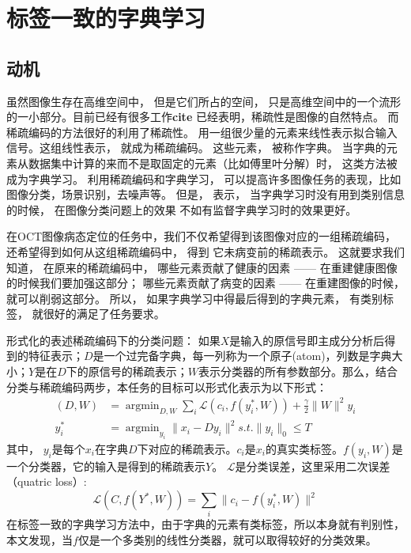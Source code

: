 \section{标签一致的字典学习}
\label{sec:lc-ksvd}
    \subsection{动机}
    虽然图像生存在高维空间中， 但是它们所占的空间， 只是高维空间中的一个流形的一小部分。目前已经有很多工作\textbf{cite} 已经表明，稀疏性是图像的自然特点。 而稀疏编码的方法很好的利用了稀疏性。 用一组很少量的元素来线性表示拟合输入信号。这组线性表示， 就成为稀疏编码。 这些元素， 被称作字典。 当字典的元素从数据集中计算的来而不是取固定的元素（比如傅里叶分解）时， 这类方法被成为字典学习。  利用稀疏编码和字典学习， 可以提高许多图像任务的表现，比如图像分类\cite{}，场景识别\cite{}，去噪声\cite{}等。  但是， \cite{}表示， 当字典学习时没有用到类别信息的时候，  在图像分类问题上的效果 不如有监督字典学习时的效果更好。 

    在OCT图像病态定位的任务中，我们不仅希望得到该图像对应的一组稀疏编码， 还希望得到如何从这组稀疏编码中， 得到 它未病变前的稀疏表示。 这就要求我们 知道， 在原来的稀疏编码中， 哪些元素贡献了健康的因素 —— 在重建健康图像的时候我们要加强这部分； 哪些元素贡献了病变的因素 —— 在重建图像的时候， 就可以削弱这部分。  所以， 如果字典学习中得最后得到的字典元素， 有类别标签， 就很好的满足了任务要求。

    形式化的表述稀疏编码下的分类问题：    
    如果$X$是输入的原信号即主成分分析后得到的特征表示；$D$是一个过完备字典，每一列称为一个原子(atom)，列数是字典大小；$Y$是在$D$下的原信号的稀疏表示；$W$表示分类器的所有参数部分。那么，结合分类与稀疏编码两步，本任务的目标可以形式化表示为以下形式：
    \begin{align}
        (D, W) & = \mathop{\arg \min}_{D, W} \sum_i \mathcal{L} (c_i, f(y_i^*, W)) + \frac{\gamma}{2}\|W\| ^2
        y_i \\
        y_i^* & = \mathop{\arg \min}_{y_i} \|x_i - Dy_i\| ^2 s.t. \|y_i\|_0 \le T \label{alg:line:ksvd-over2}
    \end{align}
    其中， $y_i$是每个$x_i$在字典$D$下对应的稀疏表示。$c_i$是$x_i$的真实类标签。$f(y_i, W)$是一个分类器，它的输入是得到的稀疏表示$Y$。 $\mathcal{L}$是分类误差，这里采用二次误差（quatric loss）:
    \begin{equation}
        \mathcal{L}(C, f(Y^*, W)) = \sum _i \|c_i - f(y_i^* , W) \| ^2 
    \end{equation}
    在标签一致的字典学习方法中，由于字典的元素有类标签，所以本身就有判别性，本文发现，当$f$仅是一个多类别的线性分类器，就可以取得较好的分类效果。


